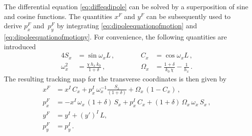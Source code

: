 The differential equation \eqref{eq:diffeqdipole} can be solved by a superposition of sine and cosine functions. The quantities $x^F$ and $y^F$ can be subsequently used to derive $p_x^F$ \mbox{and $p_y^F$} by integrating \eqref{eq:dipoleequationofmotion} and \eqref{eq:dipoleequationofmotiony}.  For convenience, the following quantities are introduced
\begin{alignat}{4}
S_x &= \sin \omega_x L \,, \quad \quad \quad &C_x &=  \cos \omega_x L \,, \label{eq:sx} \\ \omega_x^2 &= \frac{\chi \, h_x \, k_0}{1+\delta} \,,   &\Omega_x &= \frac{1+\delta}{k_0 \,\chi} - \frac{1}{h_x} \, . \label{eq:omx}
\end{alignat}
The resulting tracking map for the transverse coordinates is then given by
\begin{align}
% 
%
x^F &= x^I \, C_x + p_x^I \, \omega_x^{-1} \frac{S_x}{(1+\delta)} + \Omega_x \, \left(1 - C_x \right) \, , \label{eq:solution_thick_dipole}\\
%
%
p_x^F &= -x^I \, \omega_x \, (1+\delta) \, S_x + p_x^I \, C_x + (1+\delta) \, \Omega_x \, \omega_x \, S_x \, , \\
%
y^F &=  y^I + (y')^I \, L , \\
p_y^F &= p_y^I \, . \label{eq:tckdp4} %
%

\end{align}
